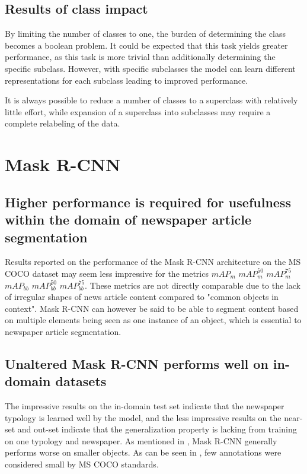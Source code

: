 \documentclass[oneside, english, bibtex]{kththesis}
\begin{document}
\subsection{Results of class impact}
By limiting the number of classes to one, the burden of determining the class becomes a boolean problem. It could be expected that this task yields greater performance, as this task is more trivial than additionally determining the specific subclass. However, with specific subclasses the model can learn different representations for each subclass leading to improved performance. 

It is always possible to reduce a number of classes to a superclass with relatively little effort, while expansion of a superclass into subclasses may require a complete relabeling of the data.

\section{Mask R-CNN}

\subsection{Higher performance is required for usefulness within the domain of newspaper article segmentation}

Results reported on the performance of the Mask R-CNN architecture on the MS COCO dataset may seem less impressive for the metrics  \textbf{$mAP_m$} \textbf{$mAP_m^{50}$} \textbf{$mAP_m^{75}$} \textbf{$mAP_{bb}$} \textbf{$mAP_{bb}^{50}$} \textbf{$mAP_{bb}^{75}$}. These metrics are not directly comparable due to the lack of irregular shapes of news article content compared to "common objects in context". Mask R-CNN can however be said to be able to segment content based on multiple elements being seen as one instance of an object, which is essential to newspaper article segmentation.

\subsection{Unaltered Mask R-CNN performs well on in-domain datasets} 

The impressive results on the in-domain test set indicate that the newspaper typology is learned well by the model, and the less impressive results on the near-set and out-set indicate that the generalization property is lacking from training on one typology and newspaper. As mentioned in , Mask R-CNN generally performs worse on smaller objects. As can be seen in , few annotations were considered small by MS COCO standards. 
\end{document}
